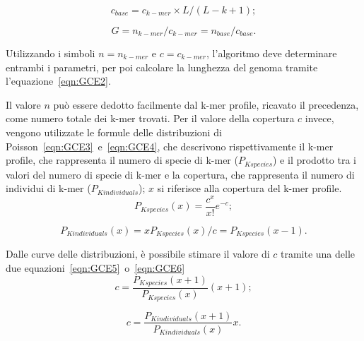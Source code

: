 \documentclass[crop=false, class=book]{standalone}
\begin{document}
	\begin{equation}
		\label{eqn:GCE1}
		c_{base} = c_{k-mer} \times L / (L-k+1);
	\end{equation}

	\begin{equation}
		\label{eqn:GCE2}
		G = n_{k-mer} / c_{k-mer} = n_{base} / c_{base}.
	\end{equation}
	
	Utilizzando i simboli $n = n_{k-mer}$ e $c = c_{k-mer}$, l'algoritmo deve determinare entrambi i parametri, per poi calcolare la lunghezza del genoma tramite l'equazione~\vref{eqn:GCE2}.
	
	Il valore $n$ può essere dedotto facilmente dal k-mer profile, ricavato il precedenza, come numero totale dei k-mer trovati. Per il valore della copertura $c$ invece, vengono utilizzate le formule delle distribuzioni di Poisson~\vref{eqn:GCE3}~e~\vref{eqn:GCE4}, che descrivono rispettivamente il k-mer profile, che rappresenta il numero di specie di k-mer ($P_{Kspecies}$) e il prodotto tra i valori del numero di specie di k-mer e la copertura, che rappresenta il numero di individui di k-mer ($P_{Kindividuals}$); $x$ si riferisce alla copertura del k-mer profile.
	\begin{equation}
		\label{eqn:GCE3}
		P_{Kspecies}(x) = \frac{c^x}{x!} e^{-c};
	\end{equation}

	\begin{equation}
		\label{eqn:GCE4}
		P_{Kindividuals}(x) = x P_{Kspecies}(x) / c = P_{Kspecies}(x-1).
	\end{equation}
	
	Dalle curve delle distribuzioni, è possibile stimare il valore di $c$ tramite una delle due equazioni~\vref{eqn:GCE5}~o~\vref{eqn:GCE6}
	\begin{equation}
		\label{eqn:GCE5}
		c = \frac{P_{Kspecies}(x+1)}{P_{Kspecies}(x)} (x+1);
	\end{equation}
	
	\begin{equation}
		\label{eqn:GCE6}
		c = \frac{P_{Kindividuals}(x+1)}{P_{Kindividuals}(x)} x.
	\end{equation}
\end{document}
